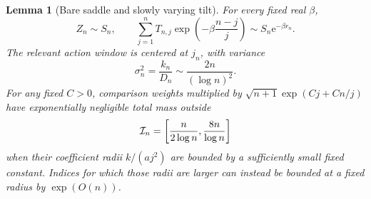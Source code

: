 \documentclass[11pt,a4paper]{article}
\numberwithin{equation}{section}
\newtheorem{lemma}[theorem]{Lemma}
\theoremstyle{definition}
\theoremstyle{remark}\newtheorem{remark}[theorem]{Remark}
\newcommand{\ee}{\mathrm e}\newcommand{\dd}{\mathrm d}
\begin{document}
\begin{lemma}[Bare saddle and slowly varying tilt]
\label{lem:bare}
For every fixed real $\beta$,
\begin{equation}
 Z_n\sim S_n,\qquad
 \sum_{j=1}^nT_{n,j}\exp\!\left(-\beta\frac{n-j}{j}\right)
 \sim S_n\ee^{-\beta r_n}.
 \label{eq:bare-tilt}
\end{equation}
The relevant action window is centered at $j_n$, with variance
\begin{equation}
 \sigma_n^2=\frac{k_n}{D_n}\sim\frac{2n}{(\log n)^2}.
 \label{eq:sigma}
\end{equation}
For any fixed $C>0$, comparison weights multiplied by
$\sqrt{n+1}\exp(Cj+Cn/j)$ have exponentially negligible total mass outside
\begin{equation}
 \mathcal I_n=\left[\frac{n}{2\log n},\frac{8n}{\log n}\right]
 \label{eq:coarse}
\end{equation}
when their coefficient radii $k/(aj^2)$ are bounded by a sufficiently small
fixed constant. Indices for which those radii are larger can instead be
bounded at a fixed radius by $\exp(O(n))$.
\end{lemma}
\end{document}
